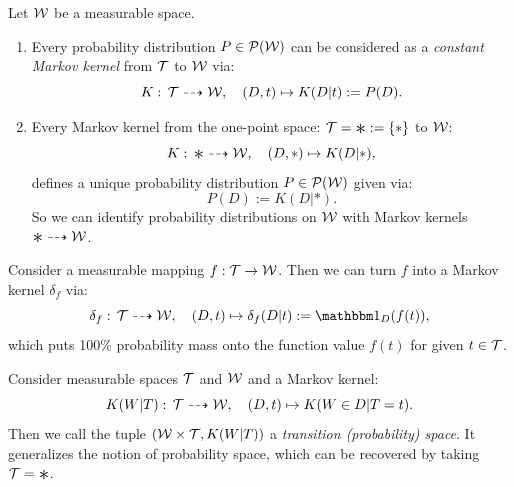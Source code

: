 \begin{Rem} Let $\mathcal{W}$ be a measurable space.
    \begin{enumerate}
        \item Every probability distribution $P \in \mathcal{P}(\mathcal{W})$ can be considered as a \emph{constant Markov kernel} from $\mathcal{T}$ to $\mathcal{W}$ via:
            \[  K:\, \mathcal{T} \dashrightarrow \mathcal{W},\quad (D,t) \mapsto K(D|t):=P(D).   \]
        \item Every Markov kernel from the  one-point space: $\Tcal=\Asterisk:=\{\ast\}$ to $\mathcal{W}$:
            \[ K:\, \Asterisk \dshto \Wcal,\quad (D,\ast) \mapsto K(D|\ast),\]
            defines a unique probability distribution $P \in \mathcal{P}(\mathcal{W})$ given via:
            \[ P(D):=K(D|\ast).\]
            So we can identify probability distributions on $\mathcal{W}$ with Markov kernels $\Asterisk \dshto \Wcal$.
    \end{enumerate}
\end{Rem}

\begin{Rem}
    Consider a measurable mapping $f: \mathcal{T} \to \mathcal{W}$. Then we can turn $f$ into a Markov kernel $\delta_f$ via:
    \[  \delta_f:\, \Tcal \dshto \Wcal, \quad (D,t) \mapsto \delta_f(D|t):= \I_D(f(t)),\]
    which puts 100\% probability mass onto the function value $f(t)$ for given $t \in \mathcal{T}$.
\end{Rem}

\begin{Def}
    Consider measurable spaces $\mathcal{T}$ and $\mathcal{W}$ and a Markov kernel:
    \[K(W|T):\, \mathcal{T} \dashrightarrow \mathcal{W},\quad (D,t) \mapsto K(W \in D|T=t).  \]
    Then we call the tuple 
    $(\mathcal{W} \times \mathcal{T}, K(W|T))$ a \emph{transition (probability) space}.
    It generalizes the notion of probability space, which can be recovered by taking $\Tcal=\Asterisk$.
\end{Def}



